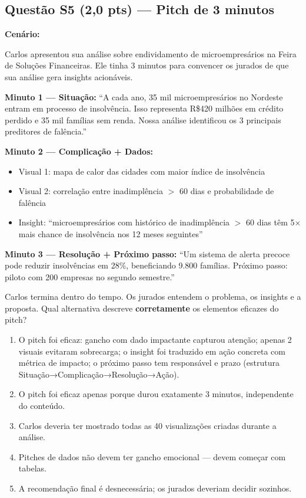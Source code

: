 \subsection*{Questão S5 (2,0 pts) — Pitch de 3 minutos}

\begin{SolvedBox}
\textbf{Cenário:}

Carlos apresentou sua análise sobre endividamento de microempresários na Feira de
Soluções Financeiras. Ele tinha 3 minutos para convencer os jurados de que sua análise
gera insights acionáveis.

\textbf{Minuto 1 — Situação:}
``A cada ano, 35 mil microempresários no Nordeste entram em processo de insolvência.
Isso representa R\$420 milhões em crédito perdido e 35 mil famílias sem renda.
Nossa análise identificou os 3 principais preditores de falência.''

\textbf{Minuto 2 — Complicação + Dados:}
\begin{itemize}
  \item Visual 1: mapa de calor das cidades com maior índice de insolvência
  \item Visual 2: correlação entre inadimplência $>$ 60 dias e probabilidade de falência
  \item Insight: ``microempresários com histórico de inadimplência $>$ 60 dias têm 5$\times$
  mais chance de insolvência nos 12 meses seguintes''
\end{itemize}

\textbf{Minuto 3 — Resolução + Próximo passo:}
``Um sistema de alerta precoce pode reduzir insolvências em 28\%, beneficiando
9.800 famílias. Próximo passo: piloto com 200 empresas no segundo semestre.''

Carlos termina dentro do tempo. Os jurados entendem o problema, os insights e a
proposta. Qual alternativa descreve \textbf{corretamente} os elementos eficazes do pitch?

\begin{enumerate}[label=\Alph*)]
  \item O pitch foi eficaz: gancho com dado impactante capturou atenção; apenas 2 visuais
  evitaram sobrecarga; o insight foi traduzido em ação concreta com métrica de impacto;
  o próximo passo tem responsável e prazo (estrutura Situação→Complicação→Resolução→Ação).
  \item O pitch foi eficaz apenas porque durou exatamente 3 minutos, independente do conteúdo.
  \item Carlos deveria ter mostrado todas as 40 visualizações criadas durante a análise.
  \item Pitches de dados não devem ter gancho emocional — devem começar com tabelas.
  \item A recomendação final é desnecessária; os jurados deveriam decidir sozinhos.
\end{enumerate}


\end{SolvedBox}
